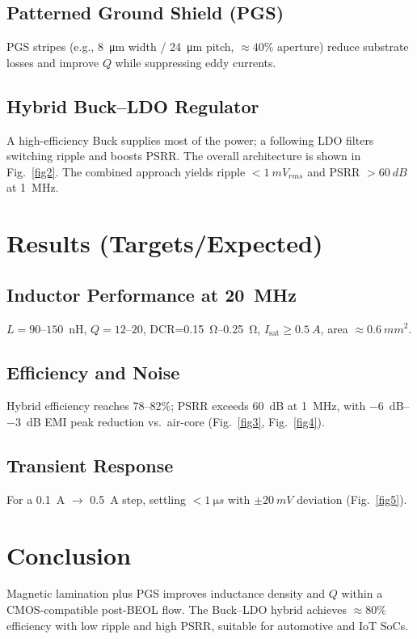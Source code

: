 \documentclass[journal]{IEEEtran}
\begin{document}
\subsection{Patterned Ground Shield (PGS)}
PGS stripes (e.g., \SI{8}{\micro\meter} width / \SI{24}{\micro\meter} pitch, $\approx 40\%$ aperture) reduce substrate losses and improve $Q$ while suppressing eddy currents.

\subsection{Hybrid Buck--LDO Regulator}
A high-efficiency Buck supplies most of the power; a following LDO filters switching ripple and boosts PSRR. The overall architecture is shown in Fig.~\ref{fig2}. The combined approach yields ripple $<\SI{1}{mV_{rms}}$ and PSRR $>\SI{60}{dB}$ at \SI{1}{MHz}.

\section{Results (Targets/Expected)}
\subsection{Inductor Performance at \SI{20}{MHz}}
$L=90$--$150$~nH, $Q=12$--$20$, DCR=\SIrange{0.15}{0.25}{\ohm}, $I_{\text{sat}} \ge \SI{0.5}{A}$, area $\approx \SI{0.6}{mm^2}$.

\subsection{Efficiency and Noise}
Hybrid efficiency reaches 78--82\%; PSRR exceeds \SI{60}{dB} at \SI{1}{MHz}, with \SIrange{-6}{-3}{dB} EMI peak reduction vs.\ air-core (Fig.~\ref{fig3}, Fig.~\ref{fig4}).

\subsection{Transient Response}
For a \SI{0.1}{A} $\to$ \SI{0.5}{A} step, settling $<\SI{1}{\micro s}$ with $\pm\SI{20}{mV}$ deviation (Fig.~\ref{fig5}).

\section{Conclusion}
Magnetic lamination plus PGS improves inductance density and $Q$ within a CMOS-compatible post-BEOL flow. The Buck--LDO hybrid achieves $\approx 80\%$ efficiency with low ripple and high PSRR, suitable for automotive and IoT SoCs.
\end{document}
